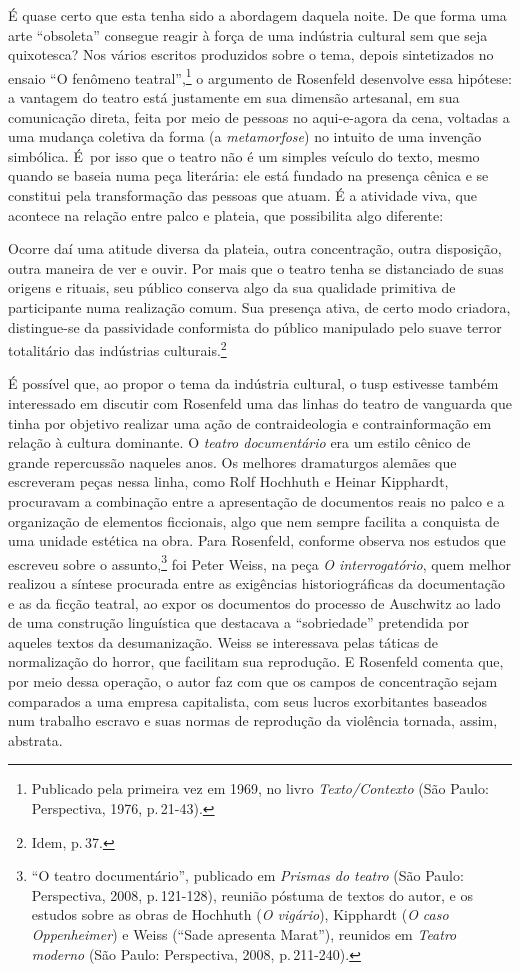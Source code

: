 É quase certo que esta tenha sido a abordagem daquela noite. De que
forma uma arte “obsoleta” consegue reagir à força de uma indústria
cultural sem que seja quixotesca? Nos vários escritos produzidos
sobre o tema, depois sintetizados no ensaio “O fenômeno teatral”,\footnote{Publicado pela primeira vez em 1969, no livro
{\it Texto/Contexto} (São Paulo: Perspectiva, 1976, p.\,21-43).}
o argumento de Rosenfeld desenvolve essa hipótese: a vantagem do teatro
está justamente em sua dimensão artesanal, em sua comunicação direta,
feita por meio de pessoas no aqui-e-agora da cena, voltadas a uma
mudança coletiva da forma (a {\it metamorfose}) no intuito de uma
invenção simbólica. É~por isso que o teatro não é um simples veículo do
texto, mesmo quando se baseia numa peça literária: ele está fundado na
presença cênica e se constitui pela transformação das pessoas que atuam.
É a atividade viva, que acontece na relação entre palco e plateia, que
possibilita algo diferente:

\startblockquote
Ocorre daí uma atitude diversa da plateia, outra concentração, outra
disposição, outra maneira de ver e ouvir. Por mais que o teatro tenha se
distanciado de suas origens e rituais, seu público conserva algo da sua
qualidade primitiva de participante numa realização comum. Sua presença
ativa, de certo modo criadora, distingue-se da passividade conformista
do público manipulado pelo suave terror totalitário das indústrias
culturais.\footnote{Idem, p.\,37.}
\stopblockquote

É possível que, ao propor o tema da indústria cultural, o {\sc tusp} estivesse
também interessado em discutir com Rosenfeld uma das linhas do teatro de
vanguarda que tinha por objetivo realizar uma ação de contraideologia e
contrainformação em relação à cultura dominante. O {\it teatro
documentário} era um estilo cênico de grande repercussão naqueles anos.
Os melhores dramaturgos alemães que escreveram peças nessa linha,
como Rolf Hochhuth e Heinar Kipphardt, procuravam a combinação
entre a apresentação de documentos reais no palco e a organização de
elementos ficcionais, algo que nem sempre facilita a conquista de uma
unidade estética na obra. Para Rosenfeld, conforme observa nos estudos
que escreveu sobre o assunto,\footnote{“O teatro documentário”,
  publicado em {\it Prismas do teatro} (São Paulo: Perspectiva, 2008, p.\,121-128), reunião póstuma de textos do autor, e os estudos sobre as
  obras de Hochhuth ({\it O vigário}), Kipphardt ({\it O caso
    Oppenheimer}) e Weiss (“Sade apresenta Marat”), reunidos em
  {\it Teatro moderno} (São Paulo: Perspectiva, 2008, p.\,211-240).} foi
Peter Weiss, na peça {\it O interrogatório}, quem melhor realizou a
síntese procurada entre as exigências historiográficas da documentação e
as da ficção teatral, ao expor os documentos do processo de Auschwitz ao
lado de uma construção linguística que destacava a “sobriedade”
pretendida por aqueles textos da desumanização. Weiss se interessava pelas
táticas de normalização do horror, que facilitam sua reprodução. E
Rosenfeld comenta que, por meio dessa operação, o autor faz com que os
campos de concentração sejam comparados a uma empresa capitalista, com
seus lucros exorbitantes baseados num trabalho escravo e suas
normas de reprodução da violência tornada, assim, abstrata.


